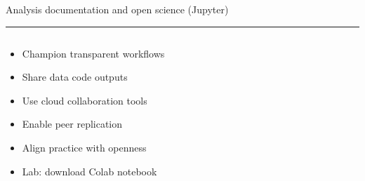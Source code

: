 \documentclass[aspectratio=169]{beamer}
\newcommand{\TitleFont}{\rmfamily}
\begin{document}
\begin{frame}[t]{}
  \vspace*{0.5cm}
  {\TitleFont\fontsize{18}{22}\selectfont\color{LUBronze}Analysis documentation and open science (Jupyter)\par}
  \vspace{0.3em}
  {\color{LUBronze}\rule{\linewidth}{0.8pt}}\par
  \vspace{0.2cm}
  \begin{columns}[t]
    \begin{column}[t]{0.4\textwidth}
      \vspace*{0pt}
      \begin{itemize}\setlength\itemsep{0.65em}
        \item Champion transparent workflows
        \item Share data code outputs
        \item Use cloud collaboration tools
        \item Enable peer replication
        \item Align practice with openness
        \item Lab: download Colab notebook
      \end{itemize}
    \end{column}
  \end{columns}
\end{frame}
\end{document}

